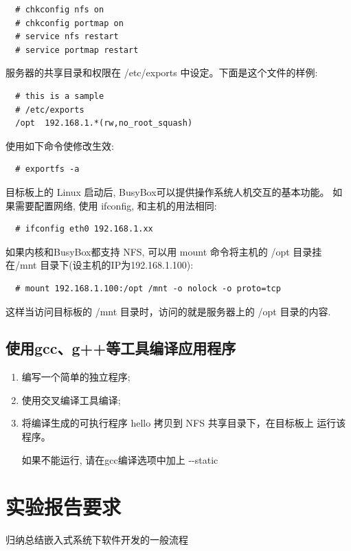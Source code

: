 \begin{boxedminipage}{.9\textwidth}
\begin{verbatim}
  # chkconfig nfs on
  # chkconfig portmap on
  # service nfs restart
  # service portmap restart
\end{verbatim}
\end{boxedminipage}

服务器的共享目录和权限在 /etc/exports 中设定。下面是这个文件的样例:

\begin{boxedminipage}{.9\textwidth}
\begin{verbatim}
  # this is a sample
  # /etc/exports
  /opt  192.168.1.*(rw,no_root_squash)
\end{verbatim}
\end{boxedminipage}

使用如下命令使修改生效:

\begin{boxedminipage}{.9\textwidth}
\begin{verbatim}
  # exportfs -a
\end{verbatim}
\end{boxedminipage}

    目标板上的 Linux 启动后, BusyBox可以提供操作系统人机交互的基本功能。
如果需要配置网络, 使用 ifconfig, 和主机的用法相同:

\begin{boxedminipage}{.9\textwidth}
\begin{verbatim}
  # ifconfig eth0 192.168.1.xx
\end{verbatim}
\end{boxedminipage}

如果内核和BusyBox都支持 NFS, 可以用 mount 命令将主机的 /opt 目录挂在/mnt 
目录下(设主机的IP为192.168.1.100):

\begin{boxedminipage}{.9\textwidth}
\begin{verbatim}
  # mount 192.168.1.100:/opt /mnt -o nolock -o proto=tcp
\end{verbatim}
\end{boxedminipage}

 这样当访问目标板的 /mnt 目录时，访问的就是服务器上的 /opt 目录的内容.

\subsection{使用gcc、g++等工具编译应用程序}
\begin{enumerate}\itemsep=-3pt
  \item 编写一个简单的独立程序;
  \item 使用交叉编译工具编译;
  \item 将编译生成的可执行程序 hello 拷贝到 NFS 共享目录下，在目标板上
		运行该程序。

		如果不能运行, 请在gcc编译选项中加上 -{}-static
\end{enumerate}

\section{实验报告要求}
    归纳总结嵌入式系统下软件开发的一般流程
